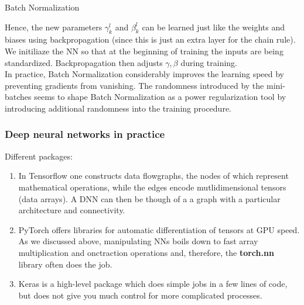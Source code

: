 \begin{enumerate}
\begin{mybox}{Batch Normalization}
\end{mybox}
Hence, the new parameters $\gamma^l_k$ and $\beta^l_k$ can be learned just like the weights and biases using backpropagation (since this is just an extra layer for the chain rule). We initiliaze the NN so that at the beginning of training the inputs are being standardized. Backpropagation then adjusts $\gamma,\beta$ during training.\\
In practice, Batch Normalization considerably improves the learning speed by preventing gradients from vanishing. The randomness introduced by the mini-batches seems to shape Batch Normalization as a power regularization tool by introducing additional randomness into the training procedure.
\end{enumerate}

\subsubsection{Deep neural networks in practice}
\label{subsubsec:dnnPractice}
Different packages:
\begin{enumerate} 
	\item In Tensorflow one constructs data flowgraphs, the nodes of which represent mathematical operations, while the edges encode mutlidimensional tensors (data arrays). A DNN can then be though of a a graph with a particular architecture and connectivity.
	\item PyTorch offers libraries for automatic differentiation of tensors at GPU speed. As we discussed above, manipulating NNs boils down to fast array multiplication and onctraction operations and, therefore, the \textbf{torch.nn} library often does the job.
	\item Keras is a high-level package which does simple jobs in a few lines of code, but does not give you much control for more complicated processes.
\end{enumerate}







